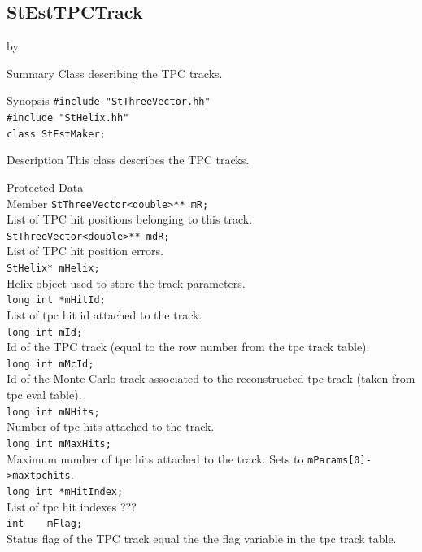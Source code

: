 \documentclass[twoside]{article}
\newcommand{\entrylabel}[1]{\mbox{\textbf{{#1}}}\hfil}%
\newenvironment{entry}
{\begin{list}{}%
    {\renewcommand{\makelabel}{\entrylabel}%
     \setlength{\labelwidth}{90pt}%
     \setlength{\leftmargin}{\labelwidth}
     \advance\leftmargin by \labelsep%
      }%
    }%
  {\end{list}}
\newcommand{\Entrylabel}[1]%
{\raisebox{0pt}[1ex][0pt]{\makebox[\labelwidth][l]%
    {\parbox[t]{\labelwidth}{\hspace{0pt}\textbf{{#1}}}}}}
\newenvironment{Entry}%
{\renewcommand{\entrylabel}{\Entrylabel}\begin{entry}}%
  {\end{entry}}
\begin{document}
\subsection{StEstTPCTrack}
\label{sec:StestTPCTrackq}
\begin{Entry}
\item[Summary]
Class describing the TPC tracks.\\ 
\item[Synopsis]
    \verb+#include "StThreeVector.hh"+\\
    \verb+#include "StHelix.hh"+\\
    \verb+class StEstMaker;+\\
\item[Description]
    	This class describes the TPC tracks. 
\item[Protected Data\\ Member]
	\verb+StThreeVector<double>** mR;+\\
	List of TPC hit positions belonging to this track.\\
	\verb+StThreeVector<double>** mdR;+\\
	List of TPC hit position errors.\\
	\verb+StHelix* mHelix;+\\
	Helix object used to store the track parameters.\\
	\verb+long int *mHitId;+\\
	List of tpc hit id attached to the track.\\
	\verb+long int mId;+\\
	Id of the TPC track (equal to the row number from the tpc track table).\\
	\verb+long int mMcId;+\\
	Id of the Monte Carlo track associated to the reconstructed tpc track (taken from tpc eval table).\\
	\verb+long int mNHits;+\\
	Number of tpc hits attached to the track.\\
	\verb+long int mMaxHits;+\\
	Maximum number of tpc hits attached to the track. Sets to \verb+mParams[0]->maxtpchits+.\\
	\verb+long int *mHitIndex;+\\
	List of tpc hit indexes ???\\
	\verb+int    mFlag;+\\
	Status flag of the TPC track equal the the flag variable in the tpc track table.\\

\end{Entry}
\end{document}
